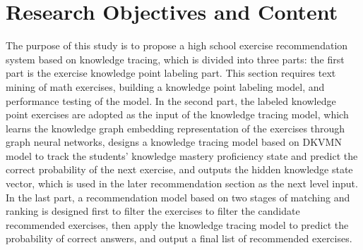 \section{Research Objectives and Content}  %

The purpose of this study is to propose a high school exercise recommendation system based on knowledge tracing, which is divided into three parts: the first part is the exercise knowledge point labeling part. This section requires text mining of math exercises, building a knowledge point labeling model, and performance testing of the model. In the second part, the labeled knowledge point exercises are adopted as the input of the knowledge tracing model, which learns the knowledge graph embedding representation of the exercises through graph neural networks, designs a knowledge tracing model based on DKVMN model to track the students' knowledge mastery proficiency state and predict the correct probability of the next exercise, and outputs the hidden knowledge state vector, which is used in the later recommendation section as the next level input. In the last part, a recommendation model based on two stages of matching and ranking is designed first to filter the exercises to filter the candidate recommended exercises, then apply the knowledge tracing model to predict the probability of correct answers, and output a final list of recommended exercises.

